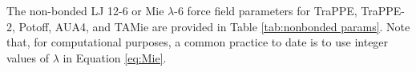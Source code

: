 \documentclass[preprint,letterpaper,floatfix,citeautoscript,aip,jcp]{revtex4-1}
\begin{document}
%
%
%
The non-bonded LJ 12-6 or Mie $\lambda$-6 force field parameters for TraPPE, TraPPE-2, Potoff, AUA4, and TAMie are provided in Table \ref{tab:nonbonded params}. Note that, for computational purposes, a common practice to date is to use integer values of $\lambda$ in Equation \ref{eq:Mie}. 
\end{document}
